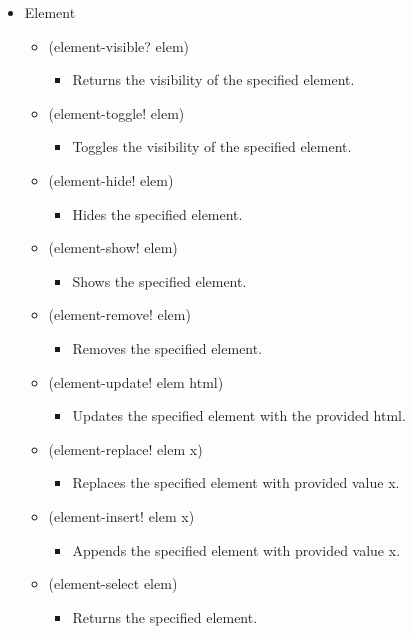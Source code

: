 \begin{itemize}
	\begin{itemize}
		\item {Element}
		\begin{itemize}
			\item {(element-visible? elem)}
				\begin{itemize}[label={}]
					\item  Returns the visibility of the specified element.
				\end{itemize}
			\item {(element-toggle! elem)}
			    \begin{itemize}[label={}]
			    	\item  Toggles the visibility of the specified element.
			    \end{itemize}
			\item {(element-hide! elem)}
			    \begin{itemize}[label={}]
			    	\item  Hides the specified element.
			    \end{itemize}
			\item {(element-show! elem)}
			    \begin{itemize}[label={}]
			    	\item  Shows the specified element.
			    \end{itemize}
			\item {(element-remove! elem)}
			    \begin{itemize}[label={}]
			    	\item  Removes the specified element.
			    \end{itemize}
			\item {(element-update! elem html)}
			    \begin{itemize}[label={}]
			    	\item  Updates the specified element with the provided html.
			    \end{itemize}
			\item {(element-replace! elem x)}
			    \begin{itemize}[label={}]
			    	\item  Replaces the specified element with provided value x.
			    \end{itemize}
			\item {(element-insert! elem x)}
			    \begin{itemize}[label={}]
			    	\item  Appends the specified element with provided value x.
			    \end{itemize}
			\item {(element-select elem)}
			    \begin{itemize}[label={}]
			    	\item  Returns the specified element.
			    \end{itemize}
		\end{itemize}
	\end{itemize}
\end{itemize}

